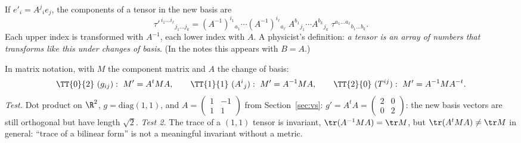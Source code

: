 \begin{formal}
If $e'_i=A^j{}_ie_j$, the components of a tensor in the new basis are
\begin{equation}\label{eq:tensortransf}
\tau'^{\,i_1\dots i_\ell}{}_{j_1\dots j_k}=(A^{-1})^{i_1}{}_{a_1}\cdots(A^{-1})^{i_\ell}{}_{a_\ell}\;A^{b_1}{}_{j_1}\cdots A^{b_k}{}_{j_k}\;\tau^{a_1\dots a_\ell}{}_{b_1\dots b_k}.
\end{equation}
Each upper index is transformed with $A^{-1}$, each lower index with $A$. A physicist's definition: \emph{a tensor is an array of numbers that transforms like this under changes of basis}. (In the notes this appears with $B=A$.)
\end{formal}

\begin{example}
In matrix notation, with $M$ the component matrix and $A$ the change of basis:
\[
\TT{0}{2}\ (g_{ij}):\ M'=A^tMA,\qquad
\TT{1}{1}\ (A^i{}_j):\ M'=A^{-1}MA,\qquad
\TT{2}{0}\ (T^{ij}):\ M'=A^{-1}M A^{-t}.
\]
\emph{Test.} Dot product on $\R^2$, $g=\mathrm{diag}(1,1)$, and $A=\begin{pmatrix}1&-1\\1&1\end{pmatrix}$ from Section~\ref{sec:vs}: $g'=A^tA=\begin{pmatrix}2&0\\0&2\end{pmatrix}$: the new basis vectors are still orthogonal but have length $\sqrt2$. \emph{Test 2.} The trace of a $(1,1)$ tensor is invariant, $\tr(A^{-1}MA)=\tr M$, but $\tr(A^tMA)\neq\tr M$ in general: ``trace of a bilinear form'' is not a meaningful invariant without a metric.
\end{example}
